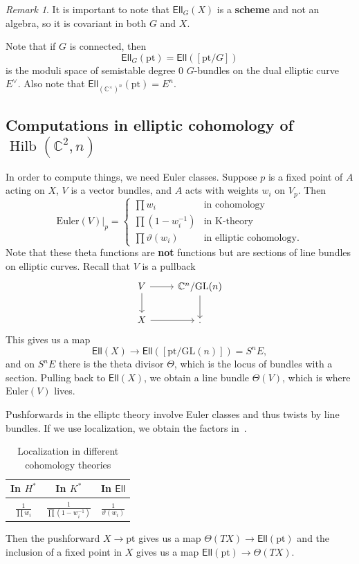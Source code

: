 \documentclass[leqno, openany]{memoir}
\theoremstyle{definition}
\theoremstyle{remark}
\newtheorem{rmk}[thm]{Remark}
\theoremstyle{plain}
\theoremstyle{definition}
\theoremstyle{remark}
\newcommand{\C}{\mathbb{C}}
\newcommand{\mr}[1]{\mathrm{#1}}
\newcommand{\ms}[1]{\mathsf{#1}}
\DeclareMathOperator{\Hilb}{Hilb}
\begin{document}
\begin{rmk}
    It is important to note that $\ms{Ell}_G(X)$ is a \textbf{scheme} and not an algebra, so it is covariant in both $G$ and $X$.
\end{rmk}

Note that if $G$ is connected, then
\[ \ms{Ell}_G(\mr{pt}) = \ms{Ell}([\mr{pt}/G]) \]
is the moduli space of semistable degree $0$ $G$-bundles on the dual elliptic curve $E^{\vee}$. Also note that $\ms{Ell}_{(\C^{\times})^n}(\mr{pt}) = E^n$.

\subsection{Computations in elliptic cohomology of $\Hilb(\C^2, n)$}

In order to compute things, we need Euler classes. Suppose $p$ is a fixed point of $A$ acting on $X$, $V$ is a vector bundles, and $A$ acts with weights $w_i$ on $V_p$. Then
\[ \mr{Euler}(V)|_p = \begin{cases}
    \prod w_i & \text{in cohomology} \\
    \prod (1-w_i^{-1}) & \text{in K-theory} \\
    \prod \vartheta(w_i) & \text{in elliptic cohomology}.
\end{cases}
\]
Note that these theta functions are \textbf{not} functions but are sections of line bundles on elliptic curves. Recall that $V$ is a pullback
\begin{equation*}
\begin{tikzcd}
    V \ar{r} \ar{d} & \C^n/\mr{GL}(n) \ar{d} \\
    X \ar{r} & [\mr{pt}/\mr{GL}(n)].
\end{tikzcd}
\end{equation*}
This gives us a map
\[ \ms{Ell}(X) \to \ms{Ell}([\mr{pt}/\mr{GL}(n)]) = S^n E, \]
and on $S^n E$ there is the theta divisor $\Theta$, which is the locus of bundles with a section. Pulling back to $\ms{Ell}(X)$, we obtain a line bundle $\Theta(V)$, which is where $\mr{Euler}(V)$ lives.

Pushforwards in the elliptc theory involve Euler classes and thus twists by line bundles. If we use localization, we obtain the factors in~.
\begin{table}[H]
    \centering
    \caption{Localization in different cohomology theories}
    \label{tab:loccohkell}
    \begin{tabular}{ccc}
        \toprule
        In $H^*$ & In $K^*$ & In $\ms{Ell}$ \\
        \midrule
        $\frac{1}{\prod w_i}$ & $\frac{1}{\prod(1-w_i^{-1})}$ & $\frac{1}{\vartheta(w_i)}$ \\
        \bottomrule
    \end{tabular}
\end{table}
Then the pushforward $X \to \mr{pt}$ gives us a map $\Theta(TX) \to \ms{Ell}(\mr{pt})$ and the inclusion of a fixed point in $X$ gives us a map $\ms{Ell}(\mr{pt}) \to \Theta(TX)$.
\end{document}
